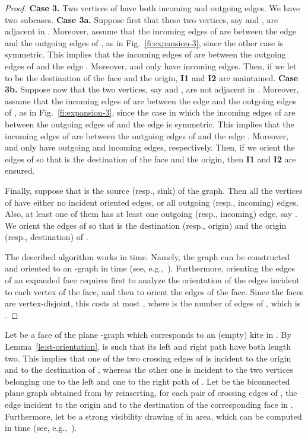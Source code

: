 \documentclass[a4paper]{article}
\begin{document}
\begin{proof}
{\noindent \bf Case 3.} Two vertices of   have both incoming and outgoing edges. We have two subcases. {\bf Case 3a.} Suppose first that these two vertices, say  and , are adjacent in .   Moreover, assume that the incoming edges of  are between the edge  and the outgoing edges of , as in Fig.~\ref{fi:expansion-3}, since the other case is symmetric. This implies that the incoming edges of  are between the outgoing edges of  and the edge . Moreover,  and  only have incoming edges. Then, if we let  to be the destination of the face and  the origin, {\bf I1} and {\bf I2} are maintained. 
{\bf Case 3b.} Suppose now that the two vertices, say  and , are not adjacent in . Moreover, assume that the incoming edges of  are between the edge  and the outgoing edges of , as in Fig.~\ref{fi:expansion-3}, since the case in which the incoming edges of  are between the outgoing edges of  and the edge  is symmetric. This implies that the incoming edges of  are between the outgoing edges of  and the edge . Moreover,  and  only have outgoing and incoming edges, respectively. Then, if we orient the edges of  so that  is the destination of the face and  the origin, then {\bf I1} and {\bf I2} are ensured.

\medskip

Finally, suppose that  is the source (resp., sink) of the graph. Then all the vertices of  have either no incident oriented edges, or all outgoing (resp., incoming) edges. Also, at least one of them has at least one outgoing (resp., incoming) edge, say . We orient the edges of  so that  is the destination (resp., origin) and  the origin (resp., destination) of . 

\medskip

The described algorithm works in  time. Namely, the graph  can be constructed and oriented to an -graph in  time (see, e.g.,~\cite{Even1976339}). Furthermore, orienting the edges of an expanded face requires first to analyze the orientation of the edges incident to each vertex of the face, and then to orient the edges of the face. Since the faces are vertex-disjoint, this costs at most , where  is the number of edges of , which is .
\end{proof}

Let  be a face of the plane -graph  which corresponds to an (empty) kite  in . By Lemma~\ref{le:st-orientation},  is such that its left and right path have both length two. This implies that one of the two crossing edges of  is incident to the origin and to the destination of , whereas the other one is incident to the two vertices belonging one to the left and one to the right path of . Let  be the biconnected plane graph obtained from  by reinserting, for each pair of crossing edges of , the edge incident to the origin and to the destination of the corresponding face in . Furthermore, let  be a strong visibility drawing of  in  area, which can be computed in  time (see, e.g.,~\cite{TamassiaTollis86}).
\end{document}
